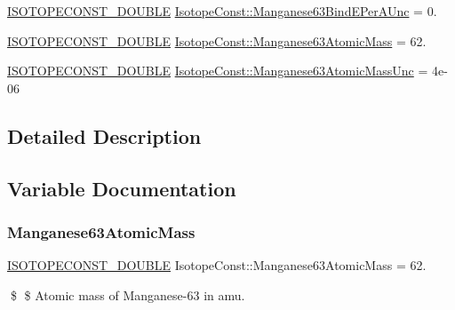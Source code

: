 \begin{DoxyCompactItemize}
\mbox{\hyperlink{group___isotope_const-_macros_ga8f45a7272ce02c0b4c65c44636ed719a}{I\+S\+O\+T\+O\+P\+E\+C\+O\+N\+S\+T\+\_\+\+D\+O\+U\+B\+LE}} \mbox{\hyperlink{group___isotope_const-_manganese-_mn63_ga5c04478b450bdf40b80e760791f6410e}{Isotope\+Const\+::\+Manganese63\+Bind\+E\+Per\+A\+Unc}} = 0.
\item 
\mbox{\hyperlink{group___isotope_const-_macros_ga8f45a7272ce02c0b4c65c44636ed719a}{I\+S\+O\+T\+O\+P\+E\+C\+O\+N\+S\+T\+\_\+\+D\+O\+U\+B\+LE}} \mbox{\hyperlink{group___isotope_const-_manganese-_mn63_ga00e8194956fb1828e3916b211a222d77}{Isotope\+Const\+::\+Manganese63\+Atomic\+Mass}} = 62.
\item 
\mbox{\hyperlink{group___isotope_const-_macros_ga8f45a7272ce02c0b4c65c44636ed719a}{I\+S\+O\+T\+O\+P\+E\+C\+O\+N\+S\+T\+\_\+\+D\+O\+U\+B\+LE}} \mbox{\hyperlink{group___isotope_const-_manganese-_mn63_ga29bacf3fcf89518ac44454718ddaa38a}{Isotope\+Const\+::\+Manganese63\+Atomic\+Mass\+Unc}} = 4e-\/06
\end{DoxyCompactItemize}


\subsection{Detailed Description}


\subsection{Variable Documentation}
\mbox{\label{group___isotope_const-_manganese-_mn63_ga00e8194956fb1828e3916b211a222d77}} 
\subsubsection{\texorpdfstring{Manganese63\+Atomic\+Mass}{Manganese63AtomicMass}}
{\footnotesize\ttfamily \mbox{\hyperlink{group___isotope_const-_macros_ga8f45a7272ce02c0b4c65c44636ed719a}{I\+S\+O\+T\+O\+P\+E\+C\+O\+N\+S\+T\+\_\+\+D\+O\+U\+B\+LE}} Isotope\+Const\+::\+Manganese63\+Atomic\+Mass = 62.}

\$ \$ Atomic mass of Manganese-\/63 in amu. \mbox{\label{group___isotope_const-_manganese-_mn63_ga29bacf3fcf89518ac44454718ddaa38a}} 
